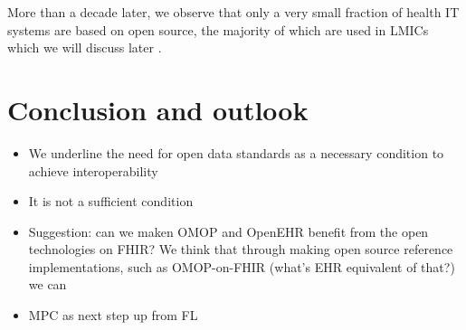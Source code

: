 \documentclass[
  authoryear]{elsarticle}
\providecommand{\tightlist}{%
  \setlength{\itemsep}{0pt}\setlength{\parskip}{0pt}}\usepackage{longtable,booktabs,array}
\begin{document}
More than a decade later, we observe that only a very small fraction of
health IT systems are based on open source, the majority of which are
used in LMICs which we will discuss later \citep{digitalpublicgoods}.

\section{Conclusion and outlook}\label{conclusion-and-outlook}

\begin{itemize}
\tightlist
\item
  We underline the need for open data standards as a necessary condition
  to achieve interoperability
\item
  It is not a sufficient condition
\item
  Suggestion: can we maken OMOP and OpenEHR benefit from the open
  technologies on FHIR? We think that through making open source
  reference implementations, such as OMOP-on-FHIR (what's EHR equivalent
  of that?) we can
\item
  MPC as next step up from FL
\end{itemize}


  
\end{document}
